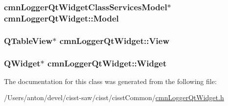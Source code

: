 \subsubsection[{Model}]{\setlength{\rightskip}{0pt plus 5cm}cmn\+Logger\+Qt\+Widget\+Class\+Services\+Model$\ast$ cmn\+Logger\+Qt\+Widget\+::\+Model\hspace{0.3cm}{\ttfamily [protected]}}\label{classcmn_logger_qt_widget_a27f08c1d7972f74d0b652e80aea618ef}
\hypertarget{classcmn_logger_qt_widget_a32f7966222926e41109f11d39aafe9b1}{}
\subsubsection[{View}]{\setlength{\rightskip}{0pt plus 5cm}Q\+Table\+View$\ast$ cmn\+Logger\+Qt\+Widget\+::\+View\hspace{0.3cm}{\ttfamily [protected]}}\label{classcmn_logger_qt_widget_a32f7966222926e41109f11d39aafe9b1}
\hypertarget{classcmn_logger_qt_widget_a114372899f6105a298324c8737d32a5f}{}
\subsubsection[{Widget}]{\setlength{\rightskip}{0pt plus 5cm}Q\+Widget$\ast$ cmn\+Logger\+Qt\+Widget\+::\+Widget\hspace{0.3cm}{\ttfamily [protected]}}\label{classcmn_logger_qt_widget_a114372899f6105a298324c8737d32a5f}


The documentation for this class was generated from the following file\+:\begin{DoxyCompactItemize}
\item 
/\+Users/anton/devel/cisst-\/saw/cisst/cisst\+Common/\hyperlink{cmn_logger_qt_widget_8h}{cmn\+Logger\+Qt\+Widget.\+h}\end{DoxyCompactItemize}
